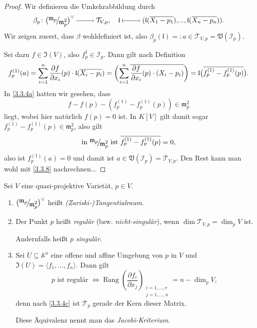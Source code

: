 \documentclass[a4paper,12pt]{scrbook}
\theoremstyle{keinenummern} %
\theoremstyle{mitnummern}
\theoremstyle{unserbeweis}
\newtheorem{proof}{Beweis}
\def\A{\mathbb{A}}
\def\V{\mathfrak{V}}
\def\I{\mathfrak{I}}
\def\II{\mathcal{I}}
\def\l{\mathfrak{l}}
\def\T{\mathcal{T}}
\def\m{\mathfrak{m}}
\newcommand{\Rang}{\operatorname{Rang}}
\let\olddotsc\dotsc %
\renewcommand{\dotsc}{\ensuremath{\!...}}
\newcommand{\ra}{\raisebox{-1pt}{\tikz{\draw[thin,shorten >=3pt, ->] (0,0) node{\hspace*{-2pt}} -- node{} (1,0);}}\penalty1000\relax}
\renewcommand{\mapsto}{\raisebox{-1pt}{\tikz{\draw[thin,shorten >=3pt, |->] (0,0) node{\hspace*{0pt}} -- node{} (1,0);}}\penalty1000\relax}
\def\Bar#1{\ensuremath\overline{#1}}
\newcommand{\Quotient}[2]{
  \mathchoice
  { %
    \raisebox{0.7ex}{\ensuremath{#1}}
    \ensuremath{\mkern-3mu}\big/\ensuremath{\mkern-3mu}
    \raisebox{-0.6ex}{\ensuremath{#2}}
  }
  { %
    #1/#2
  }
  { %
    #1/#2
  }
  { %
    #1/#2
  }
}
\begin{document}
\begin{proof}
Wir definieren die Umkehrabbildung durch
\[\beta_{p}\colon\bigl(\Quotient{\m_{p}}{\m_{p}^{2}}\bigr)^{\vee}\ra\T_{V,p},\quad\l\mapsto(\l(\Bar{X_{1}-p_{1}}),\dotsc,\l(\Bar{X_{n}-p_{n}})).\]
Wir zeigen zuerst, dass $\beta$ wohldefiniert ist, also $\beta_{p}(\l)=:a\in\T_{V,p}=\V(\II_{p})$.

Sei dazu $f\in\I(V)$, also $f_{p}^{1}\in\II_{p}$. Dann gilt nach Definition
\[f_{p}^{(1)}(a)=\sum_{i=1}^{n}\frac{\partial f}{\partial x_{i}}(p)\cdot\l(\Bar{X_{i}-p_{i}})=\biggl(\sum_{i=1}^{n}\Bar{\frac{\partial f}{\partial x_{i}}(p)\cdot(X_{i}-p_{i})}\biggr)=\l\bigl(\Bar{f_{p}^{(1)}-f_{p}^{(1)}(p)}\bigr).\]
In \cref{3.3.4a} hatten wir gesehen, dass
\[f-f(p)-(f_{p}^{(1)}-f_{p}^{(1)}(p))\in\m_{p}^{2}\]
liegt, wobei hier natürlich $f(p)=0$ ist. In $K[V]$ gilt damit sogar $f_{p}^{(1)}-f_{p}^{(1)}(p)\in\m_{p}^{2}$, also gilt 
\[\text{in }\Quotient{\m_{p}}{\m_{p}^{2}}\text{ ist }\Bar{f_{p}^{(1)}-f_{p}^{(1)}(p)}=0,\]
also ist $f_{p}^{(1)}(a)=0$ und damit ist $a\in\V(\II_{p})=\T_{V,p}$.
Den Rest kann man wohl mit \cref{3.3.8} nachrechnen...
\end{proof}

\begin{db}\label{3.3.10}
Sei $V$ eine quasi-projektive Varietät, $p\in V$.
\begin{enumerate}
\item{} $\displaystyle \bigl(\Quotient{\m_{p}}{\m_{p}^{2}}\bigr)^{\vee}$ heißt \emph{(Zariski-)Tangentialraum}.
\item{} Der Punkt $p$ heißt \emph{regulär} (bzw. \emph{nicht-singulär}), wenn $\dim\T_{V,p}=\dim_{p} V$ ist.

Andernfalls heißt $p$ \emph{singulär}.
\item{} Sei $U\subseteq\A^{n}$ eine offene und affine Umgebung von $p$ in $V$ und $\I(U)=\langle f_{1},\dotsc,f_{n}\rangle$. Dann gilt
\[p\text{ ist regulär }\iff \Rang\left(\frac{\partial f_{i}}{\partial x_{j}}\right)_{\substack{i=1,\olddotsc,r\\ j=1,\olddotsc,n}}=n-\dim_{p}V,\]
denn nach \cref{3.3.4c} ist $\T_{p}$ gerade der Kern dieser Matrix.

Diese Äquivalenz nennt man das \emph{Jacobi-Kriterium}.
\end{enumerate}\end{db}
\end{document}

